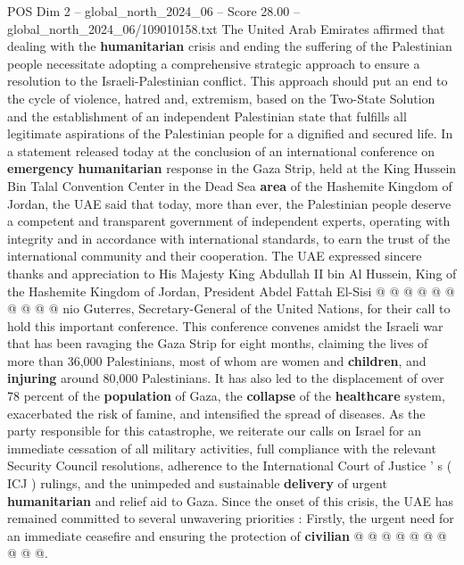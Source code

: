\begin{textsample}{POS Dim 2 – global\_north\_2024\_06 – Score 28.00 – global\_north\_2024\_06/109010158.txt}  \label{ex:f2_pos_256}
The United Arab Emirates affirmed that dealing with the \textbf{humanitarian} crisis and ending the suffering of the Palestinian people necessitate adopting a comprehensive strategic approach to ensure a resolution to the Israeli-Palestinian conflict.
This approach should put an end to the cycle of violence, hatred and, extremism, based on the Two-State Solution and the establishment of an independent Palestinian state that fulfills all legitimate aspirations of the Palestinian people for a dignified and secured life.
In a statement released today at the conclusion of an international conference on \textbf{emergency} \textbf{humanitarian} response in the Gaza Strip, held at the King Hussein Bin Talal Convention Center in the Dead Sea \textbf{area} of the Hashemite Kingdom of Jordan, the UAE said that today, more than ever, the Palestinian people deserve a competent and transparent government of independent experts, operating with integrity and in accordance with international standards, to earn the trust of the international community and their cooperation.
The UAE expressed sincere thanks and appreciation to His Majesty King Abdullah II bin Al Hussein, King of the Hashemite Kingdom of Jordan, President Abdel Fattah El-Sisi @ @ @ @ @ @ @ @ @ @ nio Guterres, Secretary-General of the United Nations, for their call to hold this important conference.
This conference convenes amidst the Israeli war that has been ravaging the Gaza Strip for eight months, claiming the lives of more than 36,000 Palestinians, most of whom are women and \textbf{children}, and \textbf{injuring} around 80,000 Palestinians.
It has also led to the displacement of over 78 percent of the \textbf{population} of Gaza, the \textbf{collapse} of the \textbf{healthcare} system, exacerbated the risk of famine, and intensified the spread of diseases.
As the party responsible for this catastrophe, we reiterate our calls on Israel for an immediate cessation of all military activities, full compliance with the relevant Security Council resolutions, adherence to the International Court of Justice ' s ( ICJ ) rulings, and the unimpeded and sustainable \textbf{delivery} of urgent \textbf{humanitarian} and relief aid to Gaza.
Since the onset of this crisis, the UAE has remained committed to several unwavering priorities : Firstly, the urgent need for an immediate ceasefire and ensuring the protection of \textbf{civilian} @ @ @ @ @ @ @ @ @ @.

\end{textsample}
